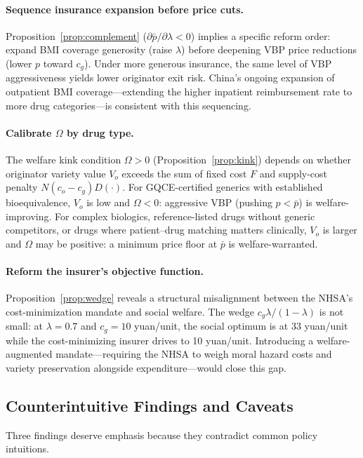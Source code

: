\documentclass[12pt]{article}
\theoremstyle{plain}
\theoremstyle{definition}
\theoremstyle{remark}
\newcommand{\pbar}{\bar{p}}
\newcommand{\1}{\mathbf{1}}
\begin{document}
\paragraph{Sequence insurance expansion before price cuts.} Proposition~\ref{prop:complement} ($\partial\pbar/\partial\lambda < 0$) implies a specific reform order: expand BMI coverage generosity (raise $\lambda$) before deepening VBP price reductions (lower $p$ toward $c_g$). Under more generous insurance, the same level of VBP aggressiveness yields lower originator exit risk. China's ongoing expansion of outpatient BMI coverage---extending the higher inpatient reimbursement rate to more drug categories---is consistent with this sequencing.

\paragraph{Calibrate $\Omega$ by drug type.} The welfare kink condition $\Omega > 0$ (Proposition~\ref{prop:kink}) depends on whether originator variety value $V_o$ exceeds the sum of fixed cost $F$ and supply-cost penalty $N(c_o - c_g)D(\cdot)$. For GQCE-certified generics with established bioequivalence, $V_o$ is low and $\Omega < 0$: aggressive VBP (pushing $p < \pbar$) is welfare-improving. For complex biologics, reference-listed drugs without generic competitors, or drugs where patient--drug matching matters clinically, $V_o$ is larger and $\Omega$ may be positive: a minimum price floor at $\pbar$ is welfare-warranted.

\paragraph{Reform the insurer's objective function.} Proposition~\ref{prop:wedge} reveals a structural misalignment between the NHSA's cost-minimization mandate and social welfare. The wedge $c_g\lambda/(1-\lambda)$ is not small: at $\lambda = 0.7$ and $c_g = 10$ yuan/unit, the social optimum is at 33 yuan/unit while the cost-minimizing insurer drives to 10 yuan/unit. Introducing a welfare-augmented mandate---requiring the NHSA to weigh moral hazard costs and variety preservation alongside expenditure---would close this gap.

\subsection{Counterintuitive Findings and Caveats}

Three findings deserve emphasis because they contradict common policy intuitions.
\end{document}
